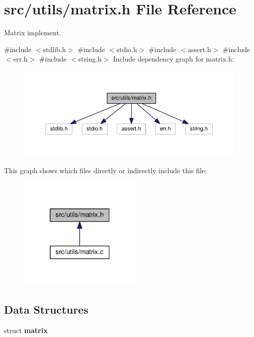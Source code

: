 \section{src/utils/matrix.h File Reference}
\label{matrix_8h}


Matrix implement.  


{\ttfamily \#include $<$stdlib.\+h$>$}\newline
{\ttfamily \#include $<$stdio.\+h$>$}\newline
{\ttfamily \#include $<$assert.\+h$>$}\newline
{\ttfamily \#include $<$err.\+h$>$}\newline
{\ttfamily \#include $<$string.\+h$>$}\newline
Include dependency graph for matrix.\+h\+:
\nopagebreak
\begin{figure}[H]
\begin{center}
\leavevmode
\includegraphics[width=350pt]{matrix_8h__incl}
\end{center}
\end{figure}
This graph shows which files directly or indirectly include this file\+:
\nopagebreak
\begin{figure}[H]
\begin{center}
\leavevmode
\includegraphics[width=169pt]{matrix_8h__dep__incl}
\end{center}
\end{figure}
\subsection*{Data Structures}
\begin{DoxyCompactItemize}
\item 
struct \textbf{ matrix}
\end{DoxyCompactItemize}
